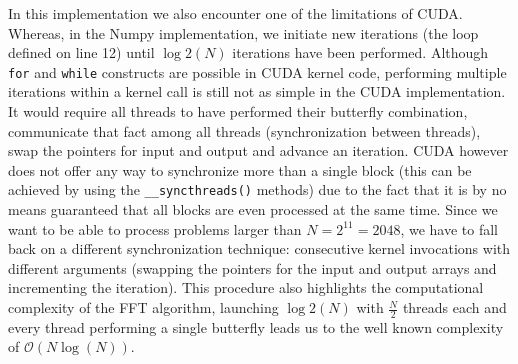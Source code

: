 \documentclass[english,11pt,a4paper,table]{article} %
\begin{document}
In this implementation we also encounter one of the limitations of CUDA. Whereas, in the Numpy implementation, we initiate new iterations (the loop defined on line 12) until $\log2(N)$ iterations have been performed. Although \texttt{for} and \texttt{while} constructs are possible in CUDA kernel code, performing multiple iterations within a kernel call is still not as simple in the CUDA implementation.
It would require all threads to have performed their butterfly combination, communicate that fact among all threads (synchronization between threads), swap the pointers for input and output and advance an iteration.
CUDA however does not offer any way to synchronize more than a single block (this can be achieved by using the \texttt{\_\_syncthreads()} methods) due to the fact that it is by no means guaranteed that all blocks are even processed at the same time.
Since we want to be able to process problems larger than $N=2^{11}=2048$\label{size-limitation}, we have to fall back on a different synchronization technique: consecutive kernel invocations with different arguments (swapping the pointers for the input and output arrays and incrementing the iteration). This procedure also highlights the computational complexity of the FFT algorithm, launching $\log2(N)$ with $\frac{N}{2}$ threads each and every thread performing a single butterfly leads us to the well known complexity of $\mathcal{O}(N \log(N))$.


\end{document}
